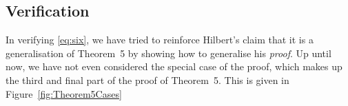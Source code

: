 
\subsection{Verification}
In verifying \ref{eq:six}, we have tried to reinforce Hilbert's claim that it is a generalisation of Theorem~5 by showing how to generalise his \emph{proof}. Up until now, we have not even considered the special case of the proof, which makes up the third and final part of the proof of Theorem~5. This is given in Figure~\ref{fig:Theorem5Cases}

